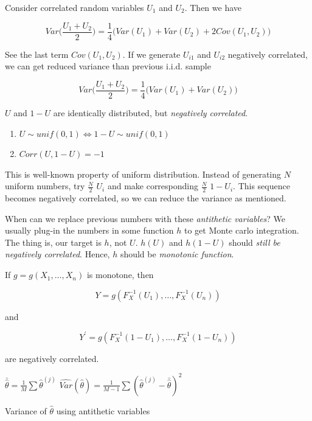 \documentclass[]{book}
\theoremstyle{definition}
\theoremstyle{definition}
\theoremstyle{definition}
\theoremstyle{remark}
\let\BeginKnitrBlock\begin \let\EndKnitrBlock\end
\begin{document}
Consider correlated random variables \(U_1\) and \(U_2\). Then we have

\[Var\bigg( \frac{U_1 + U_2}{2} \bigg) = \frac{1}{4}\Big( Var(U_1) +  Var(U_2) + 2Cov(U_1, U_2)\Big)\]

See the last term \(Cov(U_1, U_2)\). If we generate \(U_{i1}\) and \(U_{i2}\) negatively correlated, we can get reduced variance than previous i.i.d. sample

\[Var\bigg( \frac{U_1 + U_2}{2} \bigg) = \frac{1}{4}\Big( Var(U_1) +  Var(U_2)\Big)\]

\BeginKnitrBlock{lemma}
\protect\hypertarget{lem:antiunif}{}{\label{lem:antiunif} }\(U\) and \(1 - U\) are identically distributed, but \emph{negatively correlated}.

\begin{enumerate}
  \item $U \sim unif(0,1) \Leftrightarrow 1 - U \sim unif(0,1)$
  \item $Corr(U, 1 - U) = -1$
\end{enumerate}
\EndKnitrBlock{lemma}

This is well-known property of uniform distribution. Instead of generating \(N\) uniform numbers, try \(\frac{N}{2}\) \(U_i\) and make corresponding \(\frac{N}{2}\) \(1 - U_i\). This sequence becomes negatively correlated, so we can reduce the variance as mentioned.

When can we replace previous numbers with these \emph{antithetic variables}? We usually plug-in the numbers in some function \(h\) to get Monte carlo integration. The thing is, our target is \(h\), not \(U\). \(h(U)\) and \(h(1 - U)\) should \emph{still be negatively correlated}. Hence, \(h\) should be \emph{monotonic function}.

\BeginKnitrBlock{corollary}
\protect\hypertarget{cor:antifun}{}{\label{cor:antifun} }If \(g = g(X_1, \ldots, X_n)\) is monotone, then

\[Y = g(F_X^{-1}(U_1), \ldots, F_X^{-1}(U_n))\]

and

\[Y^{\prime} = g(F_X^{-1}(1 - U_1), \ldots, F_X^{-1}(1 - U_n))\]

are negatively correlated.
\EndKnitrBlock{corollary}

\begin{algorithm}[H] \label{alg:alganti}
  \SetAlgoLined
  $\bar{\hat\theta} = \frac{1}{M} \sum \hat\theta^{(j)}$\;
  $\widehat{Var}(\hat\theta) = \frac{1}{M - 1} \sum (\hat\theta^{(j)} - \bar{\hat\theta})^2$\;
  \caption{Variance of $\hat\theta$ using antithetic variables}
\end{algorithm}
\end{document}
